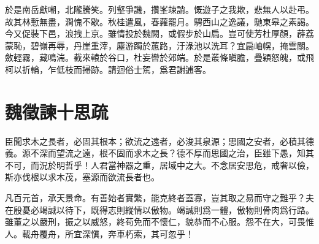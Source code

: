 於是南岳獻嘲，北隴騰笑。列壑爭譏，攢峯竦誚。慨遊子之我欺，悲無人以赴弔。故其林慙無盡，澗愧不歇。秋桂遣風，春蘿罷月。騁西山之逸議，馳東皋之素謁。今又促裝下邑，浪拽上京。雖情投於魏闕，或假步於山扃。豈可使芳杜厚顏，薜荔蒙恥，碧嶺再辱，丹崖重滓，塵游躅於蕙路，汙淥池以洗耳？宜扃岫幌，掩雲關。斂輕霧，藏鳴湍。截來轅於谷口，杜妄轡於郊端。於是叢條瞋膽，疊穎怒魄，或飛柯以折輪，乍低枝而掃跡。請迴俗士駕，爲君謝逋客。

\theendnotes

\section[諫太宗十思疏\quad{\small 魏徵}]{{\normalsize 魏徵}\quad 諫十思疏}
臣聞求木之長者，必固其根本；欲流之遠者，必浚其泉源；思國之安者，必積其德義。源不深而望流之遠，根不固而求木之長？德不厚而思國之治，臣雖下愚，知其不可，而況於明哲乎！人君當神器之重，居域中之大。不念居安思危，戒奢以儉，斯亦伐根以求木茂，塞源而欲流長者也。

凡百元首，承天景命。有善始者實繁，能克終者蓋寡，豈其取之易而守之難乎？夫在殷憂必竭誠以待下，既得志則縱情以傲物。竭誠則爲一體，傲物則骨肉爲行路。雖董之以嚴刑，振之以威怒，終苟免而不懷仁，貌恭而不心服。怨不在大，可畏惟人。載舟覆舟，所宜深愼，奔車朽索，其可忽乎！

